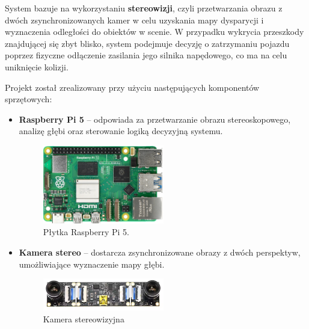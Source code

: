 \documentclass[magisterska]{pracadypl}
\begin{document}
System bazuje na wykorzystaniu \textbf{stereowizji}, czyli przetwarzania obrazu z dwóch zsynchronizowanych kamer w celu uzyskania mapy dysparycji i wyznaczenia odległości do obiektów w scenie. W przypadku wykrycia przeszkody znajdującej się zbyt blisko, system podejmuje decyzję o zatrzymaniu pojazdu poprzez fizyczne odłączenie zasilania jego silnika napędowego, co ma na celu uniknięcie kolizji.

Projekt został zrealizowany przy użyciu następujących komponentów sprzętowych:

\begin{itemize}
  \item \textbf{Raspberry Pi 5} – odpowiada za przetwarzanie obrazu stereoskopowego, analizę głębi oraz sterowanie logiką decyzyjną systemu.
    \begin{figure}[H]  %
      \centering  %
      \includegraphics[width=0.5\textwidth]{images/rpi5.png}  %
      \captionsetup{font=footnotesize}
      \caption[Płytka Raspberry Pi 5. https://www.hackatronic.com/wp-content/uploads/2024/03/Raspberry-Pi-5-Pinout--1210x642.jpg]{Płytka Raspberry Pi 5.}
    \end{figure}

  \item \textbf{Kamera stereo} – dostarcza zsynchronizowane obrazy z dwóch perspektyw, umożliwiające wyznaczenie mapy głębi.
    \begin{figure}[H]  %
      \centering  %
      \includegraphics[width=0.5\textwidth]{images/MAINSTEREO.png}  %
      \captionsetup{font=footnotesize}
      \caption[Kamera stereowizyjna. https://cell-kom.com/inne/21454-kamera-internetowa-full-hd-b16-1080p-5900217390350.html]{Kamera stereowizyjna}
      \label{fig:mono}  %
    \end{figure}


\end{itemize}
\end{document}
